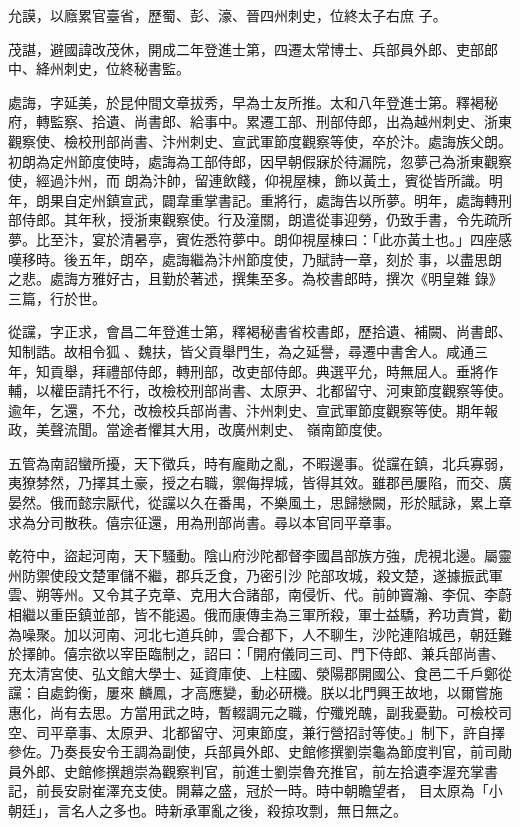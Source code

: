 \begin{pinyinscope}
 允謨，以廕累官臺省，歷蜀、彭、濠、晉四州刺史，位終太子右庶
 子。



 茂諶，避國諱改茂休，開成二年登進士第，四遷太常博士、兵部員外郎、吏部郎中、絳州刺史，位終秘書監。



 處誨，字延美，於昆仲間文章拔秀，早為士友所推。太和八年登進士第。釋褐秘府，轉監察、拾遺、尚書郎、給事中。累遷工部、刑部侍郎，出為越州刺史、浙東觀察使、檢校刑部尚書、汴州刺史、宣武軍節度觀察等使，卒於汴。處誨族父朗。初朗為定州節度使時，處誨為工部侍郎，因早朝假寐於待漏院，忽夢己為浙東觀察使，經過汴州，而
 朗為汴帥，留連飲餞，仰視屋棟，飾以黃土，賓從皆所識。明年，朗果自定州鎮宣武，闢韋重掌書記。重將行，處誨告以所夢。明年，處誨轉刑部侍郎。其年秋，授浙東觀察使。行及潼關，朗遣從事迎勞，仍致手書，令先疏所夢。比至汴，宴於清暑亭，賓佐悉符夢中。朗仰視屋棟曰：「此亦黃土也。」四座感嘆移時。後五年，朗卒，處誨繼為汴州節度使，乃賦詩一章，刻於事，以盡思朗之悲。處誨方雅好古，且勤於著述，撰集至多。為校書郎時，撰次《明皇雜
 錄》三篇，行於世。



 從讜，字正求，會昌二年登進士第，釋褐秘書省校書郎，歷拾遺、補闕、尚書郎、知制誥。故相令狐、魏扶，皆父貢舉門生，為之延譽，尋遷中書舍人。咸通三年，知貢舉，拜禮部侍郎，轉刑部，改吏部侍郎。典選平允，時無屈人。垂將作輔，以權臣請托不行，改檢校刑部尚書、太原尹、北都留守、河東節度觀察等使。逾年，乞還，不允，改檢校兵部尚書、汴州刺史、宣武軍節度觀察等使。期年報政，美聲流聞。當途者懼其大用，改廣州刺史、
 嶺南節度使。



 五管為南詔蠻所擾，天下徵兵，時有龐勛之亂，不暇邊事。從讜在鎮，北兵寡弱，夷獠棼然，乃擇其土豪，授之右職，禦侮捍城，皆得其效。雖郡邑屢陷，而交、廣晏然。俄而懿宗厭代，從讜以久在番禺，不樂風土，思歸戀闕，形於賦詠，累上章求為分司散秩。僖宗征還，用為刑部尚書。尋以本官同平章事。



 乾符中，盜起河南，天下騷動。陰山府沙陀都督李國昌部族方強，虎視北邊。屬靈州防禦使段文楚軍儲不繼，郡兵乏食，乃密引沙
 陀部攻城，殺文楚，遂據振武軍雲、朔等州。又令其子克章、克用大合諸部，南侵忻、代。前帥竇瀚、李侃、李蔚相繼以重臣鎮並部，皆不能遏。俄而康傳圭為三軍所殺，軍士益驕，矜功責賞，勸為噪聚。加以河南、河北七道兵帥，雲合都下，人不聊生，沙陀連陷城邑，朝廷難於擇帥。僖宗欲以宰臣臨制之，詔曰：「開府儀同三司、門下侍郎、兼兵部尚書、充太清宮使、弘文館大學士、延資庫使、上柱國、滎陽郡開國公、食邑二千戶鄭從讜：自處鈞衡，屢來
 麟鳳，才高應變，動必研機。朕以北門興王故地，以爾嘗施惠化，尚有去思。方當用武之時，暫輟調元之職，佇殲兇醜，副我憂勤。可檢校司空、司平章事、太原尹、北都留守、河東節度，兼行營招討等使。」制下，許自擇參佐。乃奏長安令王調為副使，兵部員外郎、史館修撰劉崇龜為節度判官，前司勛員外郎、史館修撰趙崇為觀察判官，前進士劉崇魯充推官，前左拾遺李渥充掌書記，前長安尉崔澤充支使。開幕之盛，冠於一時。時中朝瞻望者，
 目太原為「小朝廷」，言名人之多也。時新承軍亂之後，殺掠攻剽，無日無之。




\end{pinyinscope}

